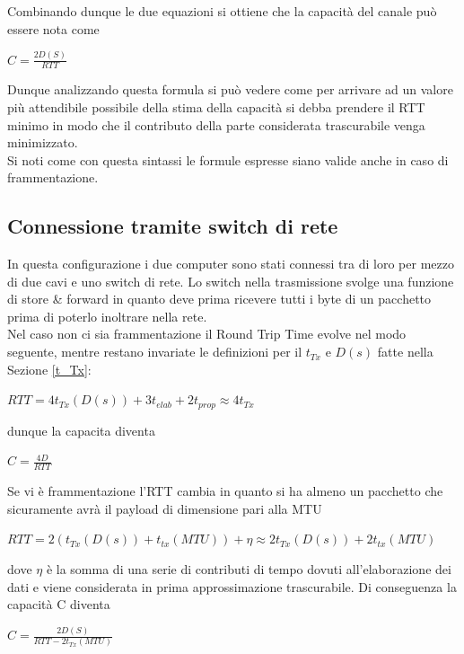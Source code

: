 \documentclass{article}
\begin{document}
Combinando dunque le due equazioni si ottiene che la capacità del canale può essere nota come
\begin{center}
    $C= \frac{2D(S)}{RTT} $
\end{center}
Dunque analizzando questa formula si può vedere come per arrivare ad un valore più attendibile possibile della stima della capacità si debba prendere il RTT minimo in modo che il contributo della parte considerata trascurabile venga minimizzato.\\
Si noti come con questa sintassi le formule espresse siano valide anche in caso di frammentazione.

\subsection{Connessione tramite switch di rete}
In questa configurazione i due computer sono stati connessi tra di loro per mezzo di due cavi e uno switch di rete. Lo switch nella trasmissione svolge una funzione di store \& forward in quanto deve prima ricevere tutti i byte di un pacchetto prima di poterlo inoltrare nella rete.\\
Nel caso non ci sia frammentazione il Round Trip Time evolve nel modo seguente, mentre restano invariate le definizioni per il $t_{Tx}$ e $D(s)$ fatte nella Sezione \ref{t_Tx}:
\begin{center}
    $RTT=4 t_{Tx}(D(s)) + 3 t_{elab} + 2 t_{prop} \approx 4 t_{Tx}$
\end{center}
dunque la capacita diventa
\begin{center}
    $C= \frac{4D}{RTT}$ 
\end{center} 

Se vi è frammentazione l'RTT cambia in quanto si ha almeno un pacchetto che sicuramente avrà il payload di dimensione pari alla MTU
\begin{center}
    $RTT=2(t_{Tx}(D(s)) + t_{tx}(MTU) ) + \eta \approx 2t_{Tx}(D(s)) + 2t_{tx}(MTU) $
\end{center}
dove $\eta$ è la somma di una serie di contributi di tempo dovuti all'elaborazione dei dati e viene considerata in prima approssimazione trascurabile.
Di conseguenza la capacità C diventa
\begin{center}
    $C=\frac{2D(S)}{RTT-2t_{Tx}(MTU)}$
\end{center}

\end{document}
